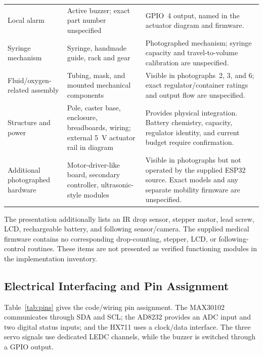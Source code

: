 \begin{table}[!t]
\begin{tabularx}{\textwidth}{@{}P{0.22\textwidth}P{0.23\textwidth}Y@{}}
Local alarm & Active buzzer; exact part number unspecified & GPIO~4 output, named in the actuator diagram and firmware. \\
Syringe mechanism & Syringe, handmade guide, rack and gear & Photographed mechanism; syringe capacity and travel-to-volume calibration are unspecified. \\
Fluid/oxygen-related assembly & Tubing, mask, and mounted mechanical components & Visible in photographs~2, 3, and 6; exact regulator/container ratings and output flow are unspecified. \\
Structure and power & Pole, caster base, enclosure, breadboards, wiring; external 5~V actuator rail in diagram & Provides physical integration. Battery chemistry, capacity, regulator identity, and current budget require confirmation. \\
Additional photographed hardware & Motor-driver-like board, secondary controller, ultrasonic-style modules & Visible in photographs but not operated by the supplied ESP32 source. Exact models and any separate mobility firmware are unspecified. \\
\bottomrule
\end{tabularx}
\end{table}

The presentation additionally lists an IR drop sensor, stepper motor, lead screw, LCD, rechargeable battery, and following sensor/camera. The supplied medical firmware contains no corresponding drop-counting, stepper, LCD, or following-control routines. These items are not presented as verified functioning modules in the implementation inventory.

\subsection{Electrical Interfacing and Pin Assignment}
Table~\ref{tab:pins} gives the code/wiring pin assignment. The MAX30102 communicates through SDA and SCL; the AD8232 provides an ADC input and two digital status inputs; and the HX711 uses a clock/data interface. The three servo signals use dedicated LEDC channels, while the buzzer is switched through a GPIO output.

